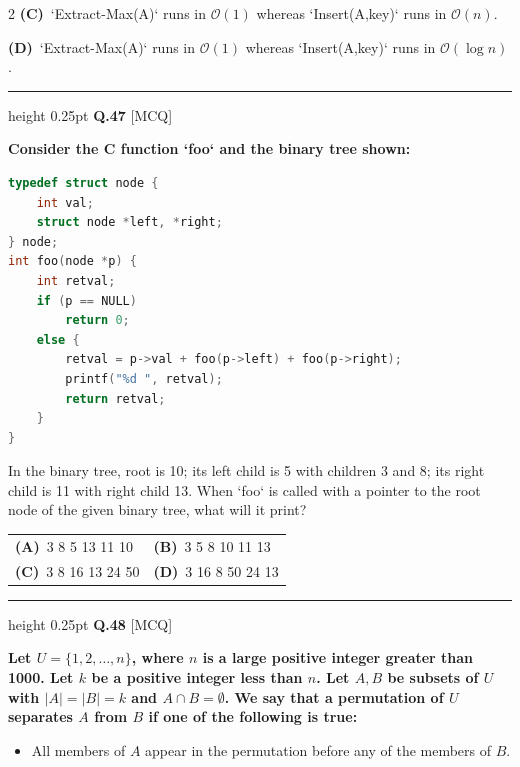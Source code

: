 \documentclass[a4paper,10pt,twoside]{article}
\begin{document}
\begin{multicols}{2}
\textbf{(C)}~`Extract-Max(A)` runs in $\mathcal{O}(1)$ whereas `Insert(A,key)` runs in $\mathcal{O}(n)$.\par\vspace{2pt}\noindent
\textbf{(D)}~`Extract-Max(A)` runs in $\mathcal{O}(1)$ whereas `Insert(A,key)` runs in $\mathcal{O}(\log n)$.
\par\vspace{6pt}\hrule height 0.25pt\vspace{6pt}
\noindent\textbf{Q.47} \hfill {\footnotesize\textsf{[MCQ]}}
\par\vspace{2pt}
{\bfseries Consider the C function `foo` and the binary tree shown:
\begin{lstlisting}[language=C]
typedef struct node {
    int val;
    struct node *left, *right;
} node;
int foo(node *p) {
    int retval;
    if (p == NULL)
        return 0;
    else {
        retval = p->val + foo(p->left) + foo(p->right);
        printf("%d ", retval);
        return retval;
    }
}
\end{lstlisting}
In the binary tree, root is 10; its left child is 5 with children 3 and 8; its right child is 11 with right child 13.
When `foo` is called with a pointer to the root node of the given binary tree, what will it print? \par}
\par\vspace{2pt}\noindent
\begin{tabular*}{\columnwidth}{@{\extracolsep{\fill}}p{}p{}@{}}
\textbf{(A)}~3 8 5 13 11 10 & \textbf{(B)}~3 5 8 10 11 13 \\
\addlinespace[2pt]
\textbf{(C)}~3 8 16 13 24 50 & \textbf{(D)}~3 16 8 50 24 13
\end{tabular*}
\par\vspace{6pt}\hrule height 0.25pt\vspace{6pt}
\noindent\textbf{Q.48} \hfill {\footnotesize\textsf{[MCQ]}}
\par\vspace{2pt}
{\bfseries Let $U = \{1, 2, \dots, n\}$, where $n$ is a large positive integer greater than 1000. Let $k$ be a positive integer less than $n$. Let $A, B$ be subsets of $U$ with $|A| = |B| = k$ and $A \cap B = \emptyset$. We say that a permutation of $U$ separates $A$ from $B$ if one of the following is true:
\begin{itemize}[itemsep=0pt,topsep=2pt]
\item All members of $A$ appear in the permutation before any of the members of $B$.

\end{itemize}}
\end{multicols}
\end{document}
